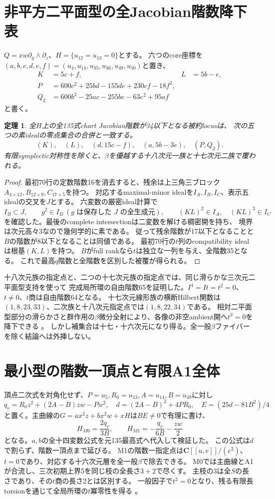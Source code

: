 \documentclass[11pt,a4paper]{ltjsarticle}
\newcommand{\CC}{\mathbf C}
\newtheorem{theorem}{定理}[section]
\theoremstyle{remark}
\begin{document}
\section{非平方二平面型の全Jacobian階数降下表}
$Q=xw\partial_y\wedge\partial_z$、$H=\{u_{12}=u_{13}=0\}$とする。
六つのcore座標を$(a,b,c,d,e,f)=(u_4,u_{14},u_{35},u_{36},u_{49},u_{50})$と置き、
\begin{align*}
 K&=5c+f,&L&=5b-e,\\
 P&=600c^2+25bd-155de+230cf-18f^2,\\
 Q_2&=600b^2-25ac-255be-63e^2+95af
\end{align*}
と書く。
\begin{theorem}
全$H$上の全135式chart Jacobian階数が34以下となる被約locusは、
次の五つの素idealの零点集合の合併と一致する。
\[
 (K),\quad(L),\quad(d,15c-f),\quad(a,5b-3e),\quad(P,Q_2).
\]
有限symplectic対称性を除くと、$\beta$を優越する十八次元一族と十七次元二族で覆われる。
\end{theorem}
\begin{proof}
最初70行の定数階数16を消去すると、残余は上三角三ブロック
$A_{4\times12},B_{12\times9},C_{17\times5}$を持つ。
対応するmaximal-minor idealを$I_A,I_B,I_C$、表示五idealの交叉を$J$とする。
六変数の厳密ideal計算で
\[
 I_B\subset J,\qquad g^2\in I_B\ (g\text{ は保存した }J\text{ の全生成元}),
 \qquad(KL)^2\in I_A,\quad(KL)^3\in I_C
\]
を確認した。最後のcomplete intersectionは二変数を解ける稠密開を持ち、
境界は次元高々3なので幾何学的に素である。
従って残余階数が17以下となることと$B$の階数が8以下となることは同値である。
最初70行の$t$列のcompatibility idealは根基$(K,L)$を持つ。
$B$がfull rankなら$t$は独立な一列を与え、全階数35となる。
これで最高$q$階数と全階数を区別した被覆が得られる\cite{binary-cover-v38}。
\end{proof}

十八次元族の指定点と、二つの十七次元族の指定点では、同じ滑らかな三次元二平面型支持を使って
完成局所環の自由階数65を証明した。$I^4=It=t^2=0$、$t\ne0$、$t$商は自由階数64となる。
十七次元線形族の横断Hilbert関数は$(1,8,23,33)$、二次族と十八次元指定点では$(1,8,22,34)$である。
相対二平面型部分の滑らかさと群作用の$\beta$微分全射により、各像の非空ambient開へ$t^2=0$を降下できる
\cite{binary-hyper-v38,binary-codim-v38}。
しかし補集合は十七・十六次元になり得る。全一般$\beta$ファイバーを除く結論へは外挿しない。

\section{最小型の階数一頂点と有限A1全体}
頂点二次式を対角化せず、$P=u_5,R_0=u_{13},A=u_{14},B=u_{49}$に対し
\[
 q_v=R_0z^2+(2A-B)zw-Pw^2,\quad
 d=(2A-B)^2+4PR_0,\quad E=(25d-81B^2)/4
\]
と置く。主曲線の$G=ax^2z+bx^2w+xH$は$BE\ne0$で有理に書け、
\[
 H_{M0}=\frac{2q_v}{3B},\qquad
 H_{M1}=-\frac{q_v}{6B}-\frac{zw}{2}
\]
となる。$a,b$の全十四変数公式を元135最高式へ代入して検証した。
この公式は$d$で割らず、階数一頂点まで延びる\cite{minimal-main-v38}。
M1の階数一指定点は$\CC[[u,e]]/(e^2)$、$t=0$であり、対応する十六次元層を全一般$\beta$で除去できる。
M0では主曲線とA1が合流し、三次初期上界5を同じ枝の全長さ$3+2$で尽くす。
主枝の3は全$S$の長さであり、その$t$商の長さ2とは区別する。
一般因子で$t^2=0$となり、残る有限長torsionを通じて全局所環の$t$冪零性を得る
\cite{minimal-rankone-v38}。
\end{document}

